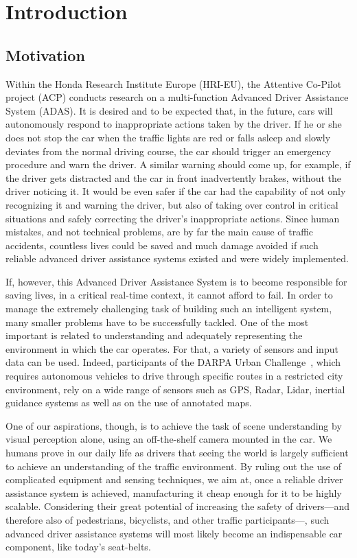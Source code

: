 \chapter{Introduction} \label{chap:intro}

\section{Motivation} \label{sect:motivation}

Within the Honda Research Institute Europe (HRI-EU), the Attentive Co-Pilot project (ACP) conducts research on a multi-function Advanced Driver Assistance System (ADAS). It is desired and to be expected that, in the future, cars will autonomously respond to inappropriate actions taken by the driver. If he or she does not stop the car when the traffic lights are red or falls asleep and slowly deviates from the normal driving course, the car should trigger an emergency procedure and warn the driver. A similar warning should come up, for example, if the driver gets distracted and the car in front inadvertently brakes, without the driver noticing it. It would be even safer if the car had the capability of not only recognizing it and warning the driver, but also of taking over control in critical situations and safely correcting the driver's inappropriate actions. Since human mistakes, and not technical problems, are by far the main cause of traffic accidents, countless lives could be saved and much damage avoided if such reliable advanced driver assistance systems existed and were widely implemented.

If, however, this Advanced Driver Assistance System is to become responsible for saving lives, in a critical real-time context, it cannot afford to fail. In order to manage the extremely challenging task of building such an intelligent system, many smaller problems have to be successfully tackled. One of the most important is related to understanding and adequately representing the environment in which the car operates. For that, a variety of sensors and input data can be used. Indeed, participants of the DARPA Urban Challenge~\cite{darpa:darpa}, which requires autonomous vehicles to drive through specific routes in a restricted city environment, rely on a wide range of sensors such as GPS, Radar, Lidar, inertial guidance systems as well as on the use of annotated maps.

One of our aspirations, though, is to achieve the task of scene understanding by visual perception alone, using an off-the-shelf camera mounted in the car. We humans prove in our daily life as drivers that seeing the world is largely sufficient to achieve an understanding of the traffic environment.
By ruling out the use of complicated equipment and sensing techniques, we aim at, once a reliable driver assistance system is achieved, manufacturing it cheap enough for it to be highly scalable. Considering their great potential of increasing the safety of drivers---and therefore also of pedestrians, bicyclists, and other traffic participants---, such advanced driver assistance systems will most likely become an indispensable car component, like today's seat-belts.

